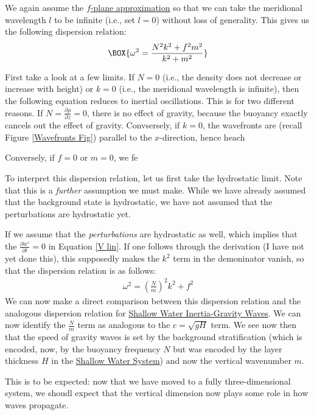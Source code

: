We again assume the \hyperref[f plane box]{$f$-plane approximation} so that we can take the meridional wavelength $l$ to be infinite (i.e., set $l=0$) without loss of generality. This gives us the following dispersion relation:
\begin{align}
    \BOX{\omega^2 = \frac{N^2  k^2   + f^2 m^2}{k^2 + m^2}}
\end{align}

First take a look at a few limits. If $N=0$ (i.e., the density does not decrease or increase with height) or $k=0$ (i.e., the meridional wavelength is infinite), then the following equation reduces to inertial oscillations. This is for two different reasons. If $N=\frac{\partial \rho}{\partial z}=0$, there is no effect of gravity, because the buoyancy exactly cancels out the effect of gravity. Convsersely, if $k=0$, the wavefronts are (recall Figure \ref{Wavefronts Fig}) parallel to the $x$-direction, hence heach 

Conversely, if $f=0$ or $m=0$, we fe

To interpret this dispersion relation, let us first take the hydrostatic limit. Note that this is a \textit{further} assumption we must make. While we have already assumed that the background state is hydrostatic, we have not assumed that the perturbations are hydrostatic yet. 

If we assume that the \textit{perturbations} are hydrostatic as well, which implies that the $\frac{\partial w'}{\partial t}=0$ in Equation \ref{V lin}. If one follows through the derivation (I have not yet done this), this supposedly makes the $k^2$ term in the demoninator vanish, so that the dispersion relation is as follows:
\begin{align*}
    \omega^2=\left( \frac{N}{m} \right)^2 k^2 + f^2
\end{align*}
We can now make a direct comparison between this dispersion relation and the analogous dispersion relation for \hyperref[IG SW Box]{Shallow Water Inertia-Gravity Waves}. We can now identify the $\frac{N}{m}$ term as analogous to the $c=\sqrt{gH}$ term. We see now then that the speed of gravity waves is set by the background stratification (which is encoded, now, by the buoyancy frequency $N$ but was encoded by the layer thickness $H$ in the \hyperref[Shallow Water System]{Shallow Water System}) and now the vertical wavenumber $m$.

This is to be expected: now that we have moved to a fully three-dimensional system, we shoudl expect that the vertical dimension now plays some role in how waves propagate.

